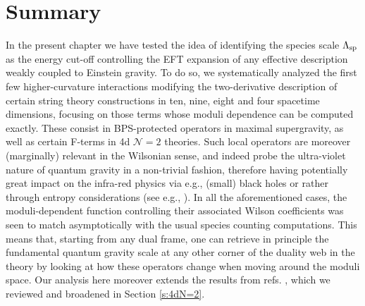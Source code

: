 

\section{Summary}\label{s:summaryhigherops}

In the present chapter we have tested the idea of identifying the species scale $\Lambda_{\text{sp}}$ as the energy cut-off controlling the EFT expansion of any effective description weakly coupled to Einstein gravity. To do so, we systematically analyzed the first few higher-curvature interactions modifying the two-derivative description of certain string theory constructions in ten, nine, eight and four spacetime dimensions, focusing on those terms whose moduli dependence can be computed exactly. These consist in BPS-protected operators in maximal supergravity, as well as certain F-terms in 4d $\mathcal{N}=2$ theories. Such local operators are moreover (marginally) relevant in the Wilsonian sense, and indeed probe the ultra-violet nature of quantum gravity in a non-trivial fashion, therefore having potentially great impact on the infra-red physics via e.g., (small) black holes or rather through entropy considerations (see e.g., \cite{Calderon-Infante:2023uhz,Cribiori:2023ffn}). 
In all the aforementioned cases, the moduli-dependent function controlling their associated Wilson coefficients was seen to match asymptotically with the usual species counting computations. This means that, starting from any dual frame, one can retrieve in principle the fundamental quantum gravity scale at any other corner of the duality web in the theory by looking at how these operators change when moving around the moduli space. Our analysis here moreover extends the results from refs. \cite{vandeHeisteeg:2022btw,vandeHeisteeg:2023ubh}, which we reviewed and broadened in Section \ref{s:4dN=2}. 

